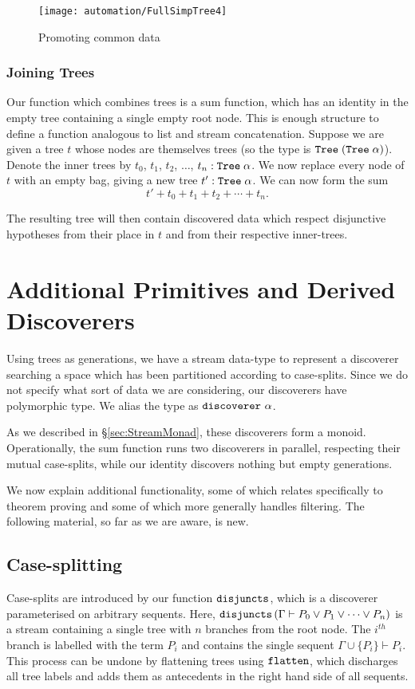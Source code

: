 \begin{figure}
\centering\texttt{[image: automation/FullSimpTree4]}
\caption{Promoting common data}
\label{fig:TreePromoting}
\end{figure}

\subsubsection{Joining Trees}
Our function which combines trees is a sum function, which has an identity in the empty tree containing a single empty root node. This is enough structure to define a  function analogous to list and stream concatenation. Suppose we are given a tree $t$ whose nodes are themselves trees (so the type is $\texttt{Tree}\;(\texttt{Tree}\; \alpha)$). Denote the inner trees by $t_0$, $t_1$, $t_2$, $\ldots$, $t_n : \texttt{Tree}\;\alpha$. We now replace every node of $t$ with an empty bag, giving a new tree $t' : \texttt{Tree}\;\alpha$. We can now form the sum 
\begin{displaymath}
t' + t_0 + t_1 + t_2 + \cdots + t_n.
\end{displaymath}

The resulting tree will then contain discovered data which respect disjunctive hypotheses from their place in $t$ and from their respective inner-trees.

\section{Additional Primitives and Derived Discoverers}\label{sec:Additional}
Using trees as generations, we have a stream data-type to represent a discoverer searching a space which has been partitioned according to case-splits. Since we do not specify what sort of data we are considering, our discoverers have polymorphic type. We alias the type as $\texttt{discoverer}\ \alpha$. 

As we described in \S\ref{sec:StreamMonad}, these discoverers form a monoid. Operationally, the sum function runs two discoverers in parallel, respecting their mutual case-splits, while our identity discovers nothing but empty generations.

We now explain additional functionality, some of which relates specifically to theorem proving and some of which more generally handles filtering. The following material, so far as we are aware, is new.

\subsection{Case-splitting}
Case-splits are introduced by our function $\texttt{disjuncts}$, which is a discoverer parameterised on arbitrary sequents. Here, $\texttt{disjuncts}\left(\Gamma \vdash P_0 \vee P_1 \vee \cdots \vee P_n\right)$ is a stream containing a single tree with $n$ branches from the root node. The $i^{th}$ branch is labelled with the term $P_i$ and contains the single sequent $\Gamma \cup \{P_i\} \vdash P_i$. This process can be undone by flattening trees using $\texttt{flatten}$, which discharges all tree labels and adds them as antecedents in the right hand side of all sequents.

